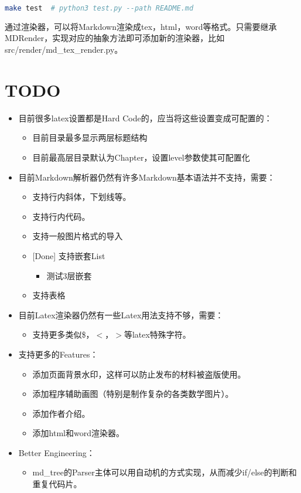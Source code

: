 \documentclass[12pt, letterpaper]{ctexrep}
\begin{document}
\begin{lstlisting}[language=Bash]
make test  # python3 test.py --path README.md
\end{lstlisting}

通过渲染器，可以将Markdown渲染成tex，html，word等格式。只需要继承MDRender，实现对应的抽象方法即可添加新的渲染器，比如src/render/md\_tex\_render.py。




\chapter{TODO}


\begin{itemize}
\item{ 目前很多latex设置都是Hard Code的，应当将这些设置变成可配置的：
\begin{itemize}
\item{ 目前目录最多显示两层标题结构 }
\item{ 目前最高层目录默认为Chapter，设置level参数使其可配置化 }
\end{itemize}
 }
\item{ 目前Markdown解析器仍然有许多Markdown基本语法并不支持，需要：
\begin{itemize}
\item{ 支持行内斜体，下划线等。 }
\item{ 支持行内代码。 }
\item{ 支持一般图片格式的导入 }
\item{ [Done] 支持嵌套List
\begin{itemize}
\item{ 测试3层嵌套 }
\end{itemize}
 }
\item{ 支持表格 }
\end{itemize}
 }
\item{ 目前Latex渲染器仍然有一些Latex用法支持不够，需要：
\begin{itemize}
\item{ 支持更多类似\$，$<$，$>$等latex特殊字符。 }
\end{itemize}
 }
\item{ 支持更多的Features：
\begin{itemize}
\item{ 添加页面背景水印，这样可以防止发布的材料被盗版使用。 }
\item{ 添加程序辅助画图（特别是制作复杂的各类数学图片）。 }
\item{ 添加作者介绍。 }
\item{ 添加html和word渲染器。 }
\end{itemize}
 }
\item{ Better Engineering：
\begin{itemize}
\item{ md\_tree的Parser主体可以用自动机的方式实现，从而减少if/else的判断和重复代码片。 }
\end{itemize}
 }
\end{itemize}
\end{document}
